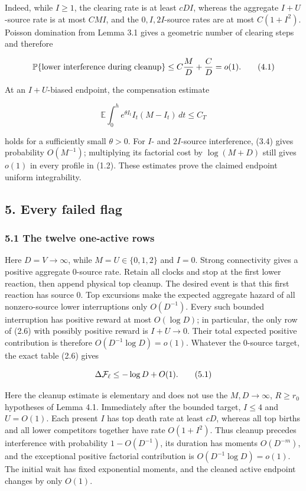 Indeed, while \(I\ge1\), the clearing rate is at least \(cDI\), whereas
the aggregate \(I+U\)-source rate is at most \(CMI\), and the
\(0,I,2I\)-source rates are at most \(C(1+I^2)\). Poisson domination
from Lemma 3.1 gives a geometric number of clearing steps and therefore

\[
 {\mathbb P}\{\text{lower interference during cleanup}\}
 \le C{M\over D}+{C\over D}=o(1).                     \tag{4.1}
\]

At an \(I+U\)-biased endpoint, the compensation estimate

\[
 {\mathbb E}\int_0^h e^{\theta I_t}
 I_t(M-I_t)\,dt\le C_T                               \tag{4.2}
\]

holds for a sufficiently small \(\theta>0\). For \(I\)- and
\(2I\)-source interference, (3.4) gives probability \(O(M^{-1})\);
multiplying its factorial cost by \(\log(M+D)\) still gives \(o(1)\) in
every profile in (1.2). These estimates prove the claimed endpoint
uniform integrability.

\subsection{5. Every failed flag}

\subsubsection{5.1 The twelve one-active
rows}

Here \(D=V\to\infty\), while \(M=U\in\{0,1,2\}\) and \(I=0\). Strong
connectivity gives a positive aggregate \(0\)-source rate. Retain all
clocks and stop at the first lower reaction, then append physical top
cleanup. The desired event is that this first reaction has source \(0\).
Top excursions make the expected aggregate hazard of all nonzero-source
lower interruptions only \(O(D^{-1})\). Every such bounded interruption
has positive reward at most \(O(\log D)\); in particular, the only row
of (2.6) with possibly positive reward is \(I+U\to0\). Their total
expected positive contribution is therefore \(O(D^{-1}\log D)=o(1)\).
Whatever the \(0\)-source target, the exact table (2.6) gives

\[
 \Delta{\cal F}_\ell\le-\log D+O(1).                  \tag{5.1}
\]

Here the cleanup estimate is elementary and does not use the
\(M,D\to\infty\), \(R\ge r_0\) hypotheses of Lemma 4.1. Immediately
after the bounded target, \(I\le4\) and \(U=O(1)\). Each present \(I\)
has top death rate at least \(cD\), whereas all top births and all lower
competitors together have rate \(O(1+I^2)\). Thus cleanup precedes
interference with probability \(1-O(D^{-1})\), its duration has moments
\(O(D^{-m})\), and the exceptional positive factorial contribution is
\(O(D^{-1}\log D)=o(1)\). The initial wait has fixed exponential
moments, and the cleaned active endpoint changes by only \(O(1)\).

